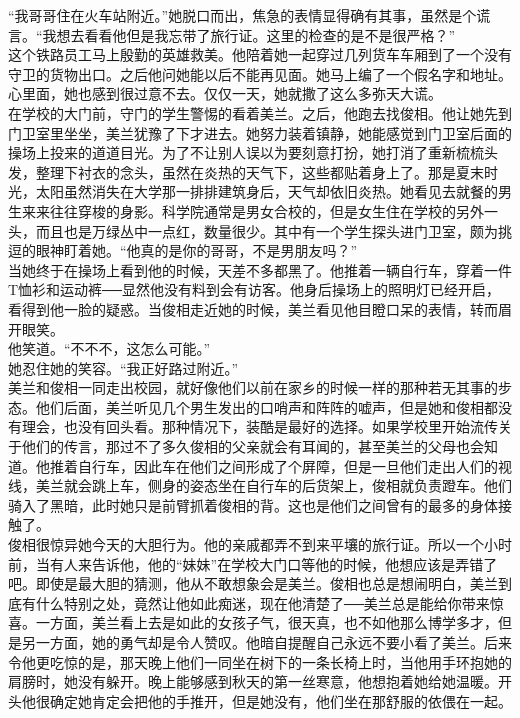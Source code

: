 “我哥哥住在火车站附近。”她脱口而出，焦急的表情显得确有其事，虽然是个谎言。“我想去看看他但是我忘带了旅行证。这里的检查的是不是很严格？”\\

这个铁路员工马上殷勤的英雄救美。他陪着她一起穿过几列货车车厢到了一个没有守卫的货物出口。之后他问她能以后不能再见面。她马上编了一个假名字和地址。心里面，她也感到很过意不去。仅仅一天，她就撒了这么多弥天大谎。\\

在学校的大门前，守门的学生警惕的看着美兰。之后，他跑去找俊相。他让她先到门卫室里坐坐，美兰犹豫了下才进去。她努力装着镇静，她能感觉到门卫室后面的操场上投来的道道目光。为了不让别人误以为要刻意打扮，她打消了重新梳梳头发，整理下衬衣的念头，虽然在炎热的天气下，这些都贴着身上了。那是夏末时光，太阳虽然消失在大学那一排排建筑身后，天气却依旧炎热。她看见去就餐的男生来来往往穿梭的身影。科学院通常是男女合校的，但是女生住在学校的另外一头，而且也是万绿丛中一点红，数量很少。其中有一个学生探头进门卫室，颇为挑逗的眼神盯着她。“他真的是你的哥哥，不是男朋友吗？”\\

当她终于在操场上看到他的时候，天差不多都黑了。他推着一辆自行车，穿着一件T恤衫和运动裤──显然他没有料到会有访客。他身后操场上的照明灯已经开启，看得到他一脸的疑惑。当俊相走近她的时候，美兰看见他目瞪口呆的表情，转而眉开眼笑。\\

他笑道。“不不不，这怎么可能。”\\

她忍住她的笑容。“我正好路过附近。”\\

美兰和俊相一同走出校园，就好像他们以前在家乡的时候一样的那种若无其事的步态。他们后面，美兰听见几个男生发出的口哨声和阵阵的嘘声，但是她和俊相都没有理会，也没有回头看。那种情况下，装酷是最好的选择。如果学校里开始流传关于他们的传言，那过不了多久俊相的父亲就会有耳闻的，甚至美兰的父母也会知道。他推着自行车，因此车在他们之间形成了个屏障，但是一旦他们走出人们的视线，美兰就会跳上车，侧身的姿态坐在自行车的后货架上，俊相就负责蹬车。他们骑入了黑暗，此时她只是前臂抓着俊相的背。这也是他们之间曾有的最多的身体接触了。\\

俊相很惊异她今天的大胆行为。他的亲戚都弄不到来平壤的旅行证。所以一个小时前，当有人来告诉他，他的“妹妹”在学校大门口等他的时候，他想应该是弄错了吧。即使是最大胆的猜测，他从不敢想象会是美兰。俊相也总是想闹明白，美兰到底有什么特别之处，竟然让他如此痴迷，现在他清楚了──美兰总是能给你带来惊喜。一方面，美兰看上去是如此的女孩子气，很天真，也不如他那么博学多才，但是另一方面，她的勇气却是令人赞叹。他暗自提醒自己永远不要小看了美兰。后来令他更吃惊的是，那天晚上他们一同坐在树下的一条长椅上时，当他用手环抱她的肩膀时，她没有躲开。晚上能够感到秋天的第一丝寒意，他想抱着她给她温暖。开头他很确定她肯定会把他的手推开，但是她没有，他们坐在那舒服的依偎在一起。\\

